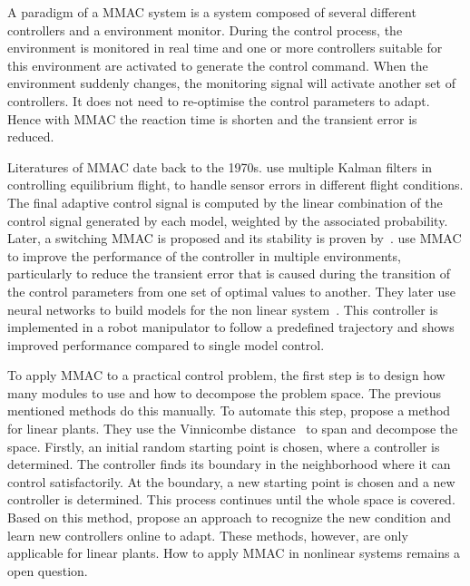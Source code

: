 A paradigm of a MMAC system is a system composed of several different controllers and a environment monitor. During the control process, the environment is monitored in real time and one or more controllers suitable for this environment are activated to generate the control command. When the environment suddenly changes, the monitoring signal will activate another set of controllers. It does not need to re-optimise the control parameters to adapt. Hence with MMAC the reaction time is shorten and the transient error is reduced.

Literatures of MMAC date back to the 1970s. \citet{athans1977stochastic} use multiple Kalman filters in controlling equilibrium flight, to handle sensor errors in different flight conditions. The final adaptive control signal is computed by the linear combination of the control signal generated by each model, weighted by the associated probability. Later, a switching MMAC is proposed and its stability is proven by~\citet{fu1986adaptive}.
\citet{narendra1994improving} use MMAC to improve the performance of the controller in multiple environments, particularly to reduce the transient error that is caused during the transition of the control parameters from one set of optimal values to another. They later use neural networks to build models for the non linear system~\citep{narendra1995adaptation,narendra1997adaptive}. This controller is implemented in a robot manipulator to follow a predefined trajectory and shows improved performance compared to single model control.

To apply MMAC to a practical control problem, the first step is to design how many modules to use and how to decompose the problem space. The previous mentioned methods do this manually. To automate this step, \citet{anderson2000multiple} propose a method for linear plants. They use the Vinnicombe distance~\citep{vinnicombe1993frequency} to span and decompose the space. Firstly, an initial random starting point is chosen, where a controller is determined. The controller finds its boundary in the neighborhood where it can control satisfactorily.
At the boundary, a new starting point is chosen and a new controller is determined. This process continues until the whole space is covered. Based on this method, \citet{lourenco2006learning} propose an approach to recognize the new condition and learn new controllers online to adapt. These methods, however, are only applicable for linear plants. How to apply MMAC in nonlinear systems remains a open question.

